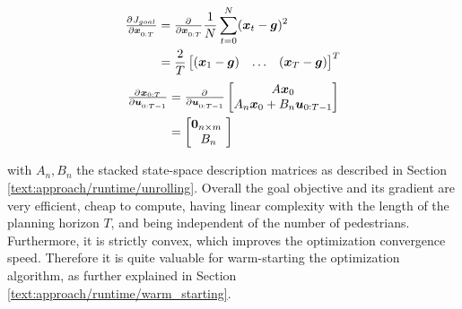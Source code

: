 \begin{align}
\pd{J_{goal}}{\x_{0:T}} &= \pd{}{\x_{0:T}} \frac{1}{N} \sum_{t = 0}^N (\x_t - \goal)^2 \\
&= \frac{2}{T} \begin{bmatrix} (\x_1 - \goal) & \hdots & (\x_T - \goal) \end{bmatrix}^T
\end{align}
\begin{align}
\pd{\x_{0:T}}{\u_{0:T-1}} &= \pd{}{\u_{0:T-1}} \begin{bmatrix} A \x_0 \\ A_n \x_0 + B_n \u_{0:T-1} \end{bmatrix} \\
&= \begin{bmatrix} \boldsymbol{0}_{n \times m} \\ B_n \end{bmatrix}
\label{eq:goal_gradient_dynamics}
\end{align}

with $A_n, B_n$ the stacked state-space description matrices as described in Section \ref{text:approach/runtime/unrolling}. 
\newline
Overall the goal objective and its gradient are very efficient, cheap to compute, having linear complexity with the length of the planning horizon $T$, and being independent of the number of pedestrians. Furthermore, it is strictly convex, which improves the optimization convergence speed. Therefore it is quite valuable for warm-starting the optimization algorithm, as further explained in Section \ref{text:approach/runtime/warm_starting}.
